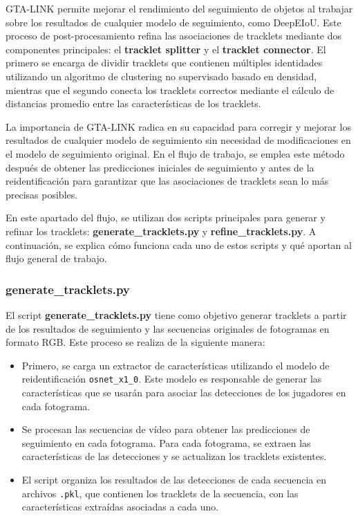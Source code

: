 \documentclass[12pt, a4paper, twoside]{article}
\begin{document}
	GTA-LINK permite mejorar el rendimiento del seguimiento de objetos al trabajar sobre los resultados de cualquier modelo de seguimiento, como DeepEIoU. Este proceso de post-procesamiento refina las asociaciones de tracklets mediante dos componentes principales: el \textbf{tracklet splitter} y el \textbf{tracklet connector}. El primero se encarga de dividir tracklets que contienen múltiples identidades utilizando un algoritmo de clustering no supervisado basado en densidad, mientras que el segundo conecta los tracklets correctos mediante el cálculo de distancias promedio entre las características de los tracklets.
	
	La importancia de GTA-LINK radica en su capacidad para corregir y mejorar los resultados de cualquier modelo de seguimiento sin necesidad de modificaciones en el modelo de seguimiento original. En el flujo de trabajo, se emplea este método después de obtener las predicciones iniciales de seguimiento y antes de la reidentificación para garantizar que las asociaciones de tracklets sean lo más precisas posibles.
	
	
	En este apartado del flujo, se utilizan dos scripts principales para generar y refinar los tracklets: \textbf{generate\_tracklets.py} y \textbf{refine\_tracklets.py}. A continuación, se explica cómo funciona cada uno de estos scripts y qué aportan al flujo general de trabajo.
	
	\subsubsection{generate\_tracklets.py}
	
	El script \textbf{generate\_tracklets.py} tiene como objetivo generar tracklets a partir de los resultados de seguimiento y las secuencias originales de fotogramas en formato RGB. Este proceso se realiza de la siguiente manera:
	
	\begin{itemize}
		\item Primero, se carga un extractor de características utilizando el modelo de reidentificación \texttt{osnet\_x1\_0}. Este modelo es responsable de generar las características que se usarán para asociar las detecciones de los jugadores en cada fotograma.
		\item Se procesan las secuencias de vídeo para obtener las predicciones de seguimiento en cada fotograma. Para cada fotograma, se extraen las características de las detecciones y se actualizan los tracklets existentes.
		\item El script organiza los resultados de las detecciones de cada secuencia en archivos \texttt{.pkl}, que contienen los tracklets de la secuencia, con las características extraídas asociadas a cada uno.
	\end{itemize}
	
\end{document}
